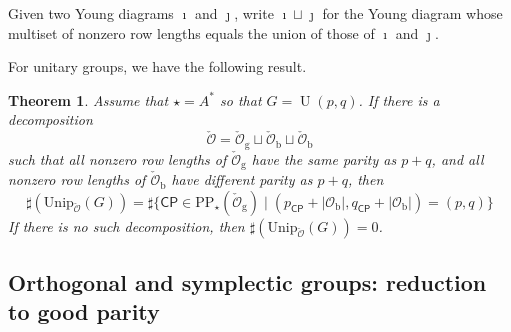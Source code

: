 \documentclass[12pt,a4paper]{amsart}
\def\abs#1{\left|{#1}\right|}
\newcommand{\CO}{{\mathcal {O}}}
\newcommand{\CP}{{\mathcal {P}}}
\newcommand{\oU}{\operatorname{U}}
\numberwithin{equation}{section}
\newtheorem{thm}{Theorem}[section]
\theoremstyle{remark}
\def\Unip{\mathrm{Unip}}
\def\CP{\mathsf{CP}}
\begin{document}
Given two Young diagrams $\imath$ and $\jmath$, write $\imath\sqcup \jmath$ for the Young diagram whose multiset of nonzero row lengths equals the union of those of $\imath$ and $\jmath$. 

For unitary groups, we have the following result.
\begin{thm}
Assume that $\star=A^*$ so that $G=\oU(p,q)$. If there is a decomposition 
 \[
   \check \CO=\check \CO_{\mathrm g} \sqcup \check \CO_{\mathrm b}\sqcup \check \CO_{\mathrm b}
 \]
 such that all nonzero row lengths of $\check \CO_{\mathrm g}$ have the same parity as $p+q$, and all nonzero row lengths of $\check \CO_{\mathrm b}$ have different parity as $p+q$, then 
 \[
\sharp(\Unip_{\check \CO}(G))=
        \sharp\{\CP\in \mathrm{PP}_\star(\check \CO_{\mathrm g})\mid (p_\CP+\abs{\CO_{\mathrm b}}, q_\CP+\abs{\CO_{\mathrm b}})=(p,q)\} 
        \]
If there is no such decomposition, then $\sharp(\Unip_{\check \CO}(G))=0$. 

\end{thm}

\subsection{Orthogonal and symplectic groups: reduction to good parity}
\end{document}
